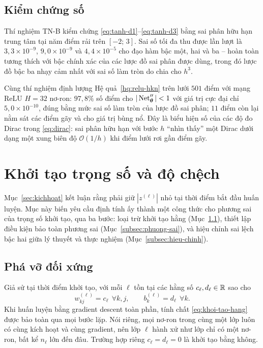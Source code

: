 \subsection{Kiểm chứng số}
 
Thí nghiệm TN-B kiểm chứng \eqref{eq:tanh-d1}--\eqref{eq:tanh-d3} bằng sai phân
hữu hạn trung tâm tại năm điểm rải trên $[-2;\,3]$. Sai số tối đa thu được lần
lượt là $3{,}3\times10^{-9}$, $9{,}0\times10^{-9}$ và $4{,}4\times10^{-5}$ cho
đạo hàm bậc một, hai và ba -- hoàn toàn tương thích với bậc chính xác của các
lược đồ sai phân được dùng, trong đó lược đồ bậc ba nhạy cảm nhất với sai số làm
tròn do chia cho $h^3$.
 
Cùng thí nghiệm định lượng Hệ quả~\ref{hq:relu-hkn} trên lưới $501$ điểm với
mạng ReLU $H = 32$ nơ-ron: $97{,}8\%$ số điểm cho $|\operatorname{Net}''_{\bm{\theta}}| < 1$ với
giá trị cực đại chỉ $5{,}0\times10^{-10}$, đúng bằng mức sai số làm tròn của
lược đồ sai phân; $11$ điểm còn lại nằm sát các điểm gãy và cho giá trị bùng nổ.
Đây là biểu hiện số của các độ đo Dirac trong \eqref{eq:dirac}: sai phân hữu hạn
với bước $h$ ``nhìn thấy'' một Dirac dưới dạng một xung biên độ
$\mathcal{O}(1/h)$ khi điểm lưới rơi gần điểm gãy.
 
\section{Khởi tạo trọng số và độ chệch}
\label{sec:khoitao}
 
Mục~\ref{sec:kichhoat} kết luận rằng phải giữ $|z^{(\ell)}|$ nhỏ tại thời điểm
bắt đầu huấn luyện. Mục này biến yêu cầu định tính ấy thành một công thức cho
phương sai của trọng số khởi tạo, qua ba bước: loại trừ khởi tạo hằng
(Mục~\ref{subsec:doi-xung}), thiết lập điều kiện bảo toàn phương sai
(Mục~\ref{subsec:phuong-sai}), và hiệu chỉnh sai lệch bậc hai giữa lý thuyết và
thực nghiệm (Mục~\ref{subsec:hieu-chinh}).
 
\subsection{Phá vỡ đối xứng}
\label{subsec:doi-xung}
 
\begin{menhde}
\label{md:doi-xung}
Giả sử tại thời điểm khởi tạo, với mỗi $\ell$ tồn tại các hằng số
$c_\ell, d_\ell \in \mathbb{R}$ sao cho
\begin{equation}
w^{(\ell)}_{kj} = c_\ell \ \ \forall k,j,
\qquad
b^{(\ell)}_k = d_\ell \ \ \forall k .
\label{eq:khoi-tao-hang}
\end{equation}
Khi huấn luyện bằng gradient descent toàn phần, tính chất
\eqref{eq:khoi-tao-hang} được bảo toàn qua mọi bước lặp. Nói riêng, mọi nơ-ron
trong cùng một lớp luôn có cùng kích hoạt và cùng gradient, nên lớp $\ell$ hành
xử như lớp chỉ có một nơ-ron, bất kể $n_\ell$ lớn đến đâu. Trường hợp riêng
$c_\ell = d_\ell = 0$ là khởi tạo bằng không.
\end{menhde}
 
